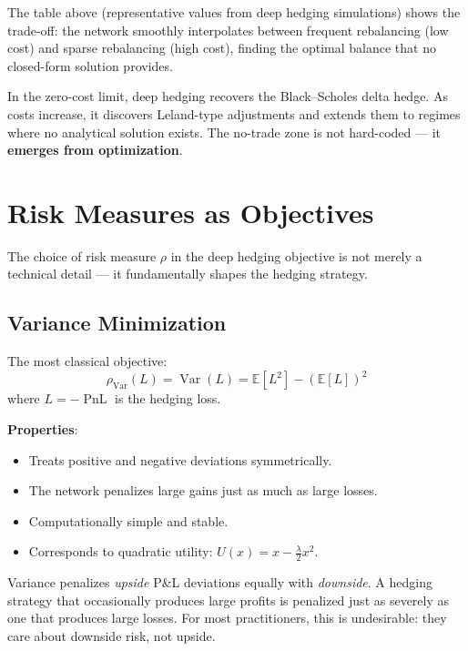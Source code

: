 \documentclass[11pt, a4paper]{article}
\theoremstyle{definition}
\theoremstyle{plain}
\theoremstyle{remark}
\newcommand{\EV}{\mathbb{E}}
\newcommand{\PnL}{\operatorname{PnL}}
\begin{document}
The table above (representative values from deep hedging simulations) shows the trade-off:
the network smoothly interpolates between frequent rebalancing (low cost) and sparse rebalancing
(high cost), finding the optimal balance that no closed-form solution provides.

\begin{keyresult}
In the zero-cost limit, deep hedging recovers the Black--Scholes delta hedge.
As costs increase, it discovers Leland-type adjustments and extends them
to regimes where no analytical solution exists.
The no-trade zone is not hard-coded --- it \textbf{emerges from optimization}.
\end{keyresult}

\section{Risk Measures as Objectives}
\label{sec:risk-measures}

The choice of risk measure $\rho$ in the deep hedging objective is not merely a
technical detail --- it fundamentally shapes the hedging strategy.

\subsection{Variance Minimization}

The most classical objective:
\[
    \rho_{\text{Var}}(L) = \operatorname{Var}(L) = \EV[L^2] - (\EV[L])^2
\]
where $L = -\PnL$ is the hedging loss.

\textbf{Properties}:
\begin{itemize}
    \item Treats positive and negative deviations symmetrically.
    \item The network penalizes large gains just as much as large losses.
    \item Computationally simple and stable.
    \item Corresponds to quadratic utility: $U(x) = x - \frac{\lambda}{2}x^2$.
\end{itemize}

\begin{warningbox}
Variance penalizes \emph{upside} P\&L deviations equally with \emph{downside}.
A hedging strategy that occasionally produces large profits is penalized just as
severely as one that produces large losses.
For most practitioners, this is undesirable: they care about downside risk, not upside.
\end{warningbox}
\end{document}
